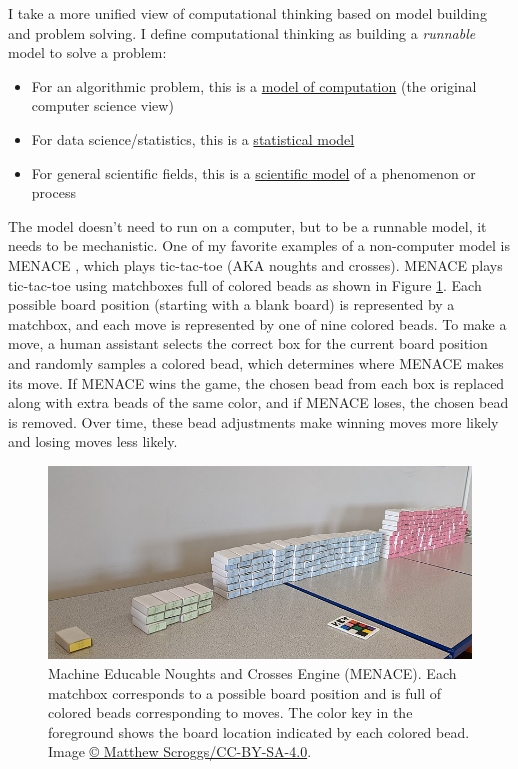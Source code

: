 \documentclass[
]{book}
\providecommand{\tightlist}{%
  \setlength{\itemsep}{0pt}\setlength{\parskip}{0pt}}
\begin{document}
I take a more unified view of computational thinking based on model building and problem solving.
I define computational thinking as building a \emph{runnable} model to solve a problem:

\begin{itemize}
\tightlist
\item
  For an algorithmic problem, this is a \href{https://en.wikipedia.org/wiki/Model_of_computation}{model of computation} (the original computer science view)
\item
  For data science/statistics, this is a \href{https://en.wikipedia.org/wiki/Statistical_model}{statistical model}
\item
  For general scientific fields, this is a \href{https://en.wikipedia.org/wiki/Scientific_modelling}{scientific model} of a phenomenon or process
\end{itemize}

The model doesn't need to run on a computer, but to be a runnable model, it needs to be mechanistic.
One of my favorite examples of a non-computer model is MENACE \citep{Michie1963}, which plays tic-tac-toe (AKA noughts and crosses).
MENACE plays tic-tac-toe using matchboxes full of colored beads as shown in Figure \ref{fig:menace}.
Each possible board position (starting with a blank board) is represented by a matchbox, and each move is represented by one of nine colored beads.
To make a move, a human assistant selects the correct box for the current board position and randomly samples a colored bead, which determines where MENACE makes its move.
If MENACE wins the game, the chosen bead from each box is replaced along with extra beads of the same color, and if MENACE loses, the chosen bead is removed.
Over time, these bead adjustments make winning moves more likely and losing moves less likely.



\begin{figure}
\includegraphics[width=1\linewidth]{images/800px-Mscroggs-MENACE-cropped} \caption{Machine Educable Noughts and Crosses Engine (MENACE). Each matchbox corresponds to a possible board position and is full of colored beads corresponding to moves. The color key in the foreground shows the board location indicated by each colored bead. Image \href{https://commons.wikimedia.org/wiki/File:Mscroggs-MENACE-cropped.jpg}{© Matthew Scroggs/CC-BY-SA-4.0}.}\label{fig:menace}
\end{figure}
\end{document}
